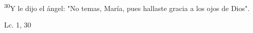 \documentclass[../../rosario.tex]{subfiles}
\begin{document}
    \textsuperscript{30}Y le dijo el ángel: "No temas, María, pues hallaste gracia a los ojos de Dios".
    \begin{flushright}
    Lc. 1, 30
    \end{flushright}
\end{document}
